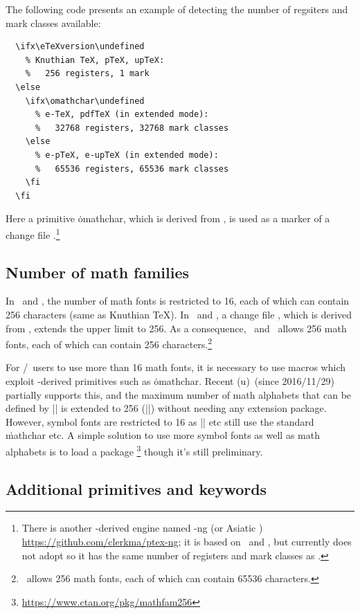 \documentclass[a4paper,11pt,dvipdfmx]{article}
\begin{document}
The following code presents an example of detecting the number of
regsiters and mark classes available:
\begin{verbatim}
  \ifx\eTeXversion\undefined
    % Knuthian TeX, pTeX, upTeX:
    %   256 registers, 1 mark
  \else
    \ifx\omathchar\undefined
      % e-TeX, pdfTeX (in extended mode):
      %   32768 registers, 32768 mark classes
    \else
      % e-pTeX, e-upTeX (in extended mode):
      %   65536 registers, 65536 mark classes
    \fi
  \fi
\end{verbatim}
Here a primitive \.{omathchar}, which is derived from \OMEGA, is used
as a marker of a change file .\footnote{%
There is another \pTeX-derived engine named \pTeX-ng (or Asiatic \pTeX)
\url{https://github.com/clerkma/ptex-ng}; it is based on
\eTeX\ and \upTeX, but currently does not adopt 
so it has the same number of registers and mark classes as \eTeX.}

\subsection{Number of math families}

In \pTeX\ and \upTeX,
the number of math fonts is restricted to 16,
each of which can contain 256 characters (same as Knuthian \TeX).
In \epTeX\ and \eupTeX, a change file ,
which is derived from \OMEGA, extends the upper limit to 256.
As a consequence, \epTeX\ and \eupTeX\ allows 256 math fonts,
each of which can contain 256 characters.\footnote{\OMEGA\ allows
256 math fonts, each of which can contain 65536 characters.}

For \pLaTeX/\upLaTeX\ users to use more than 16 math fonts,
it is necessary to use macros which exploit \OMEGA-derived primitives
such as \.{omathchar}.
Recent (u)\pLaTeX\ (since 2016/11/29) partially supports this,
and the maximum number of math alphabets that can be defined by
|\DeclareMathAlphabet| is extended to 256 (|\e@mathgroup@top|)
without needing any extension package.
However, symbol fonts are restricted to 16 as
|\DeclareMathSymbol| etc still use the standard \.{mathchar} etc.
A simple solution to use more symbol fonts as well as math alphabets
is to load a package \footnote{%
\url{https://www.ctan.org/pkg/mathfam256}} though it's still preliminary.

\subsection{Additional primitives and keywords}
\end{document}
